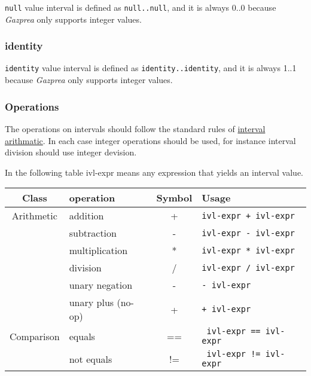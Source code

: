 \documentclass[../../gazprea.tex]{subfiles}
\begin{document}
		\texttt{null} value interval is defined as \texttt{null..null}, and it is always 0..0 because \textit{Gazprea}
		only supports integer values.

	\subsubsection{identity}

		\texttt{identity} value interval is defined as \texttt{identity..identity}, and it is always 1..1 because
		\textit{Gazprea} only supports integer values.

	\subsubsection{Operations}

		The operations on intervals should follow the standard rules of
		\href{http://en.wikipedia.org/wiki/Interval_arithmetic}{interval arithmatic}. In each case integer operations
		should be used, for instance interval division should use integer devision.

		In the following table ivl-expr means any expression that yields an interval value.

		\begin{center}
			\begin{tabular}{|c|l|c|l|}
				\hline
				\textbf{Class} & \textbf{operation} & \textbf{Symbol} & \textbf{Usage} \\
				\hline
				Arithmetic & addition           & + & \texttt{ivl-expr + ivl-expr}  \\
				           & subtraction        & - &  \texttt{ivl-expr - ivl-expr}	\\
				           & multiplication     & * & \texttt{ivl-expr * ivl-expr}	\\
				           & division           & / & \texttt{ivl-expr / ivl-expr}	\\
				           & unary negation     & - & \texttt{- ivl-expr}	          \\
				           & unary plus (no-op) & + & \texttt{+ ivl-expr}           \\
				\hline
				Comparison & equals     & == & \texttt{ ivl-expr == ivl-expr} \\
				           & not equals & != & \texttt{ ivl-expr != ivl-expr} \\
				\hline
			\end{tabular}
		\end{center}
\end{document}
